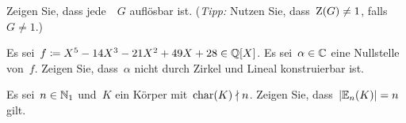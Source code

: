 \documentclass{scrartcl}
\begin{document}
\begin{exercise}
  Zeigen Sie, dass jede~~$G$ auflösbar ist.
  (\emph{Tipp:} Nutzen Sie, dass~$\operatorname{Z}(G) \neq 1$, falls~$G \neq 1$.)
\end{exercise}

\begin{exercise}[subtitle = {Erstklausur~19/20}]
  Es sei~$f \coloneqq X^5 - 14 X^3 - 21 X^2 + 49 X + 28 \in \mathbb{Q}[X]$.
  Es sei~$\alpha \in \mathbb{C}$ eine Nullstelle von~$f$.
  Zeigen Sie, dass~$\alpha$ nicht durch Zirkel und Lineal konstruierbar ist.
\end{exercise}

\begin{exercise}
  Es sei~$n \in \mathbb{N}_1$ und~$K$ ein Körper mit~$\operatorname{char}(K) \nmid n$.
  Zeigen Sie, dass~$\lvert \operatorname{\mathbb{E}}_n(K) \rvert = n$ gilt.
\end{exercise}
\end{document}
